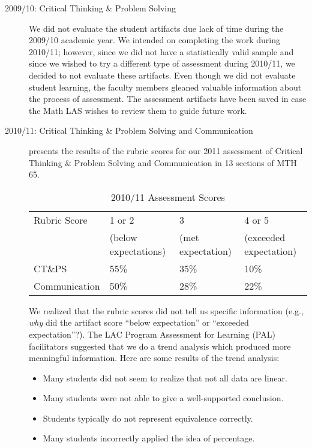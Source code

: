 \begin{description}
\item[2009/10: Critical Thinking \& Problem Solving]
We did not evaluate the student artifacts due lack of time during the 2009/10 academic year. We intended on completing the work during 2010/11; however, since we did not have a statistically valid sample and since we wished to try a different type of assessment during 2010/11, we decided to not evaluate these artifacts.  Even though we did not evaluate student learning, the faculty members gleaned valuable information about the process of assessment. The assessment artifacts have been saved in case the Math LAS wishes to review them to guide future work.
\item[2010/11:  Critical Thinking \& Problem Solving and Communication]
 presents the results of the rubric scores for our 2011 assessment of Critical Thinking \& Problem Solving and Communication in 13 sections of MTH 65.
\begin{table}[!htb]
\centering
\caption{2010/11 Assessment Scores}\label{ass:tab:201011scores}
\begin{tabular}{llll}
\toprule
Rubric Score & 1 or 2 & 3 & 4 or 5\\
&(below expectations)&(met expectation)&(exceeded expectation)\\
\midrule
CT\&PS &55\%&35\%&10\%\\
Communication &50\%&28\%&22\%\\
\bottomrule
\end{tabular}
\end{table}

We realized that the rubric scores did not tell us specific information (e.g., \emph{why} did the artifact score ``below expectation'' or ``exceeded expectation''?).  The LAC Program Assessment for Learning (PAL) facilitators suggested that we do a trend analysis which produced more meaningful information. Here are some results of the trend analysis:
\begin{itemize}
\item Many students did not seem to realize that not all data are linear.
\item Many students were not able to give a well-supported conclusion.
\item Students typically do not represent equivalence correctly.
\item Many students incorrectly applied the idea of percentage.
\end{itemize}


\end{description}
